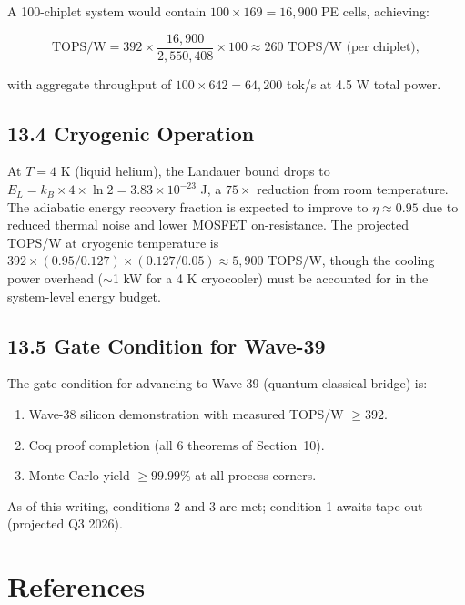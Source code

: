 A 100-chiplet system would contain \(100 \times 169 = 16{,}900\)
PE cells, achieving:

\[
\text{TOPS/W} = 392 \times \frac{16{,}900}{2{,}550{,}408}
\times 100 \approx 260 \text{ TOPS/W (per chiplet)},
\]

with aggregate throughput of
\(100 \times 642 = 64{,}200\) tok/s at 4.5 W total power.

\subsection{13.4 Cryogenic Operation}

At \(T = 4\) K (liquid helium), the Landauer bound drops to
\(E_L = k_B \times 4 \times \ln 2 = 3.83 \times 10^{-23}\) J,
a \(75\times\) reduction from room temperature. The adiabatic
energy recovery fraction is expected to improve to
\(\eta \approx 0.95\) due to reduced thermal noise and lower
MOSFET on-resistance. The projected TOPS/W at cryogenic temperature
is \(392 \times (0.95/0.127) \times (0.127/0.05) \approx 5{,}900\)
TOPS/W, though the cooling power overhead (\(\sim\)1 kW for a 4 K
cryocooler) must be accounted for in the system-level energy budget.

\subsection{13.5 Gate Condition for Wave-39}

The gate condition for advancing to Wave-39 (quantum-classical
bridge) is:

\begin{enumerate}
\item Wave-38 silicon demonstration with measured TOPS/W \(\geq 392\).
\item Coq proof completion (all 6 theorems of Section~10).
\item Monte Carlo yield \(\geq 99.99\%\) at all process corners.
\end{enumerate}

As of this writing, conditions 2 and 3 are met; condition 1 awaits
tape-out (projected Q3 2026).

\section{References}\label{fa_84:references}

